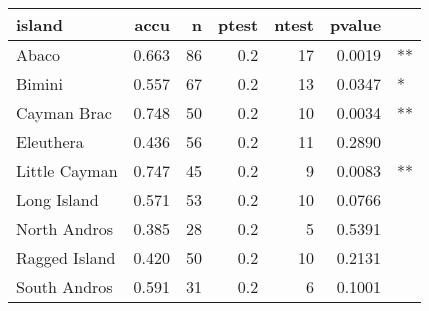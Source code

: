 
\begin{tabular}{l|r|r|r|r|r|l}
\hline
island & accu & n & ptest & ntest & pvalue & \\
\hline
Abaco & 0.663 & 86 & 0.2 & 17 & 0.0019 & **\\
\hline
Bimini & 0.557 & 67 & 0.2 & 13 & 0.0347 & *\\
\hline
Cayman Brac & 0.748 & 50 & 0.2 & 10 & 0.0034 & **\\
\hline
Eleuthera & 0.436 & 56 & 0.2 & 11 & 0.2890 & \\
\hline
Little Cayman & 0.747 & 45 & 0.2 & 9 & 0.0083 & **\\
\hline
Long Island & 0.571 & 53 & 0.2 & 10 & 0.0766 & \\
\hline
North Andros & 0.385 & 28 & 0.2 & 5 & 0.5391 & \\
\hline
Ragged Island & 0.420 & 50 & 0.2 & 10 & 0.2131 & \\
\hline
South Andros & 0.591 & 31 & 0.2 & 6 & 0.1001 & \\
\hline
\end{tabular}

